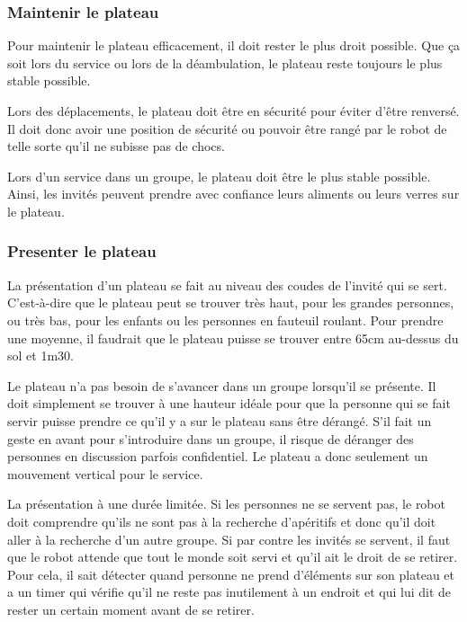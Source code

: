 \subsubsection{Maintenir le plateau}

Pour maintenir le plateau efficacement, il doit rester le plus droit possible. Que ça soit lors du service ou lors de la déambulation, le plateau reste toujours le plus stable possible. 

Lors des déplacements, le plateau doit être en sécurité pour éviter d’être renversé. Il doit donc avoir une position de sécurité ou pouvoir être rangé par le robot de telle sorte qu’il ne subisse pas de chocs.

Lors d’un service dans un groupe, le plateau doit être le plus stable possible. Ainsi, les invités peuvent prendre avec confiance leurs aliments ou leurs verres sur le plateau.


\subsubsection{Presenter le plateau}

La présentation d’un plateau se fait au niveau des coudes de l’invité qui se sert. C’est-à-dire que le plateau peut se trouver très haut, pour les grandes personnes, ou très bas, pour les enfants ou les personnes en fauteuil roulant. Pour prendre une moyenne, il faudrait que le plateau puisse se trouver entre 65cm au-dessus du sol et 1m30.

Le plateau n’a pas besoin de s’avancer dans un groupe lorsqu’il se présente. Il doit simplement se trouver à une hauteur idéale pour que la personne qui se fait servir puisse prendre ce qu’il y a sur le plateau sans être dérangé. S’il fait un geste en avant pour s’introduire dans un groupe, il risque de déranger des personnes en discussion parfois confidentiel. Le plateau a donc seulement un mouvement vertical pour le service.

La présentation à une durée limitée. Si les personnes ne se servent pas, le robot doit comprendre qu’ils ne sont pas à la recherche d’apéritifs et donc qu’il doit aller à la recherche d’un autre groupe. Si par contre les invités se servent, il faut que le robot attende que tout le monde soit servi et qu’il ait le droit de se retirer. Pour cela, il sait détecter quand personne ne prend d’éléments sur son plateau et a un timer qui vérifie qu’il ne reste pas inutilement à un endroit et qui lui dit de rester un certain moment avant de se retirer.

